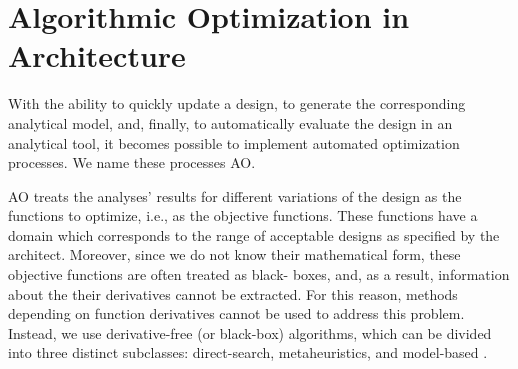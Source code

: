 \section{Algorithmic Optimization in Architecture}
\label{sec: Methodology}

With the ability to quickly update a design, to generate the corresponding analytical model, and, finally, to automatically evaluate the design in an analytical tool, it becomes possible to implement automated optimization processes. We name these processes \ac{AO}.

\ac{AO} treats the analyses' results for different variations of the design as the functions to optimize, i.e., as the objective functions. These functions have a domain which corresponds to the range of acceptable designs as specified by the architect. Moreover, since we do not know their mathematical form, these objective functions are often treated as black- boxes, and, as a result, information about the their derivatives cannot be extracted. For this reason, methods depending on function derivatives cannot be used to address this problem. Instead, we use derivative-free (or black-box) algorithms, which can be divided into three distinct subclasses: direct-search, metaheuristics, and model-based \cite{Conn2009,Glover2003Metaheuristics,Koziel2011}.

